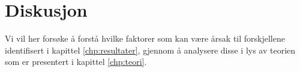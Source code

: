 \chapter{Diskusjon}
\label{chp:diskusjon}

Vi vil her forsøke å forstå hvilke faktorer som kan være årsak til forskjellene identifisert i kapittel \ref{chp:resultater}, gjennom å analysere disse i lys av teorien som er presentert i kapittel \ref{chp:teori}. 